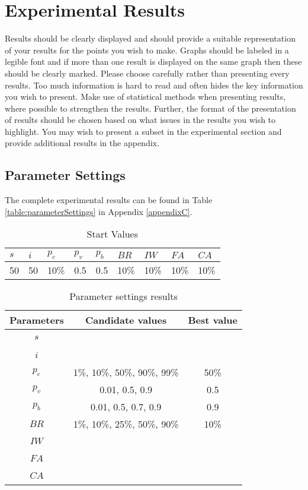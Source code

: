 \section{Experimental Results}

Results should be clearly displayed and should provide a suitable representation of your results for the points you wish to make. Graphs should be labeled in a legible font and if more than one result is displayed on the same graph then these should be clearly marked.   Please choose carefully rather than presenting every results. Too much information is hard to read and often hides the key information you wish to present. Make use of statistical methods when presenting results, where possible to strengthen the results.  Further, the format of the presentation of results should be chosen based on what issues in the results you wish to highlight. You may wish to present a subset in the experimental section and provide additional results in the appendix.

\subsection{Parameter Settings}
\label{subsec:parameterSettings_results}

The complete experimental results can be found in Table \ref{table:parameterSettings} in Appendix \ref{appendixC}.

\begin{table}[H]
	\centering
    \begin{tabular}{|l|l|l|l|l|l|l|l|l|}
 	\hline
 	$s$ & $i$ & $p_{e}$ & $p_{v}$ & $p_{b}$ & $BR$  & $IW$ & $FA$ & $CA$  \\
 	\hline
    50 & 50 & 10\% & 0.5 & 0.5 & 10\% & 10\% & 10\%  & 10\%  \\
	\hline
    \end{tabular}
    \caption {Start Values}
    \label{table:parameter_startvalues}
	\end{table}

	\begin{table}[H]
	\centering
    \begin{tabular}{|c|c||c|}
 	\hline
 	Parameters & Candidate values & Best value\\
 	\hline
    $s$ & ~ & ~ \\
    $i$ & ~ & ~ \\
    $p_{e}$ & 1\%, 10\%, 50\%, 90\%, 99\% & 50\% \\
    $p_{v}$ & 0.01, 0.5, 0.9 & 0.5 \\
    $p_{b}$ & 0.01, 0.5, 0.7, 0.9 & 0.9 \\
    $BR$ & 1\%, 10\%, 25\%, 50\%, 90\% & 10\% \\
    $IW$ & ~ & ~ \\
    $FA$ & ~ & ~ \\
    $CA$ & ~ & ~ \\
	\hline
    \end{tabular}
    \caption {Parameter settings results}
    \label{table:parameterSettings2}
	\end{table}

